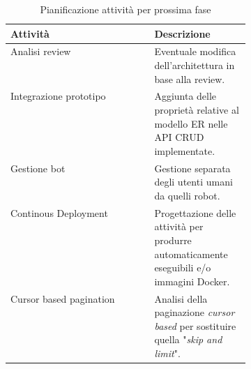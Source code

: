 \documentclass{article}
\begin{document}
\begin{table}[h]
    \centering
    \begin{tabular}{|l|p{0.4\linewidth}|}
        \hline
         Attività & Descrizione \\
        \hline
        \hline
         Analisi review & Eventuale modifica dell'architettura in base alla review. \\
        \hline
        Integrazione prototipo & Aggiunta delle proprietà relative al modello ER nelle API CRUD implementate. \\ 
        \hline
        Gestione bot & Gestione separata degli utenti umani da quelli robot. \\ 
        \hline
        Continous Deployment & Progettazione delle attività per produrre automaticamente eseguibili e/o immagini Docker. \\
        \hline
        Cursor based pagination & Analisi della paginazione \textit{cursor based} per sostituire quella "\textit{skip and limit}".\\
        \hline
    \end{tabular}
    \caption{Pianificazione attività per prossima fase}
    \label{tab:next_phase}
\end{table}


\clearpage

\printbibliography
\end{document}
